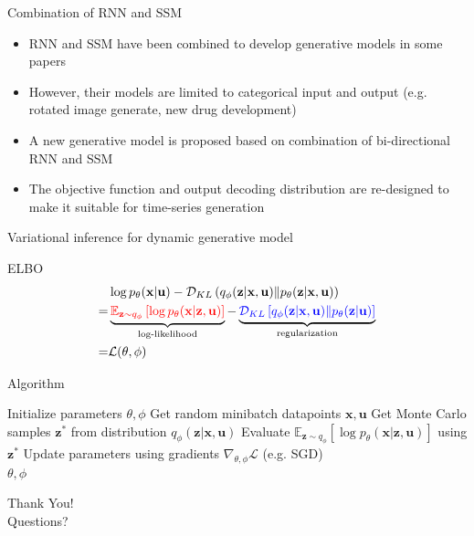 \documentclass [aspectratio=169]{beamer}
\begin{document}
\begin{frame}{Combination of RNN and SSM}
    \begin{itemize}
    	\item RNN and SSM have been combined to develop generative models in some papers
    	\item However, their models are limited to categorical input and output (e.g. rotated image generate, new drug development)
    	\item A new generative model is proposed based on combination of bi-directional RNN and SSM
    	\item The objective function and output decoding distribution are re-designed to make it suitable for time-series generation
    \end{itemize}
\end{frame}



\begin{frame}{Variational inference for dynamic generative model}
	\begin{block}{ELBO}
	\begin{equation*}
		\begin{aligned} 
		& \log p_{\theta}(\mathbf{x} | \mathbf{u})-\mathcal{D}_{K L}\left(q_{\phi}(\mathbf{z} | \mathbf{x}, \mathbf{u}) \| p_{\theta}(\mathbf{z} | \mathbf{x}, \mathbf{u})\right) \\
		=& \underbrace{\color{red}\mathbb{E}_{\mathbf{z} \sim q_{\phi}}\left[\log p_{\theta}(\mathbf{x} | \mathbf{z}, \mathbf{u})\right]}_{\text{log-likelihood}}-\underbrace{\color{blue}\mathcal{D}_{K L}\left[q_{\phi}(\mathbf{z} | \mathbf{x}, \mathbf{u}) \| p_{\theta}(\mathbf{z} | \mathbf{u})\right]}_{\text{regularization}} \\
		=& \mathcal{L}(\theta, \phi) \end{aligned}
	\end{equation*}	
	\end{block}
	


\end{frame}

\begin{frame}{Algorithm}

    \begin{algorithm}[H]
        \caption{Dynamic generative model}
        \begin{algorithmic}
        \State Initialize parameters $\theta, \phi$ 
        \Repeat
        \State Get random minibatch datapoints $\mathbf{x}, \mathbf{u}$
        \State Get Monte Carlo samples $\mathbf{z}^* $ from distribution $q_{\phi}(\mathbf{z}|\mathbf{x}, \mathbf{u})$
        \State Evaluate $\mathbb{E}_{\mathbf{z} \sim q_{\phi}} [\log p_{\theta}(\mathbf{x}|\mathbf{z}, \mathbf{u})]$ using $\mathbf{z}^* $
        \State Update parameters using gradients $\nabla_{\theta,\phi}\mathcal{L}$ (e.g. SGD)
        \\ \Return $\theta, \phi$
        \end{algorithmic}
        \label{algorithm}
    \end{algorithm}
	
\end{frame}

\begin{frame}
    \begin{center}
        \Huge Thank You!\\
        \Huge Questions?
    \end{center}
\end{frame}
\end{document}
